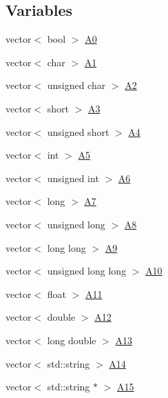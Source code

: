 \subsection*{Variables}
\begin{DoxyCompactItemize}
\item 
vector$<$ bool $>$ \hyperlink{namespaceboost_1_1numeric_1_1ublas_a5464d550b5fd0951f14b0bd93ccb0df2}{A0}
\item 
vector$<$ char $>$ \hyperlink{namespaceboost_1_1numeric_1_1ublas_adecfd0f3cb516b97b0da1565629f59d1}{A1}
\item 
vector$<$ unsigned char $>$ \hyperlink{namespaceboost_1_1numeric_1_1ublas_a04baccb7ef5149e6079f0f39904c10fc}{A2}
\item 
vector$<$ short $>$ \hyperlink{namespaceboost_1_1numeric_1_1ublas_a21ae51ca27e984306163f9e9e23981a3}{A3}
\item 
vector$<$ unsigned short $>$ \hyperlink{namespaceboost_1_1numeric_1_1ublas_a6ee2ec81873323b383e5f3e133cb38d9}{A4}
\item 
vector$<$ int $>$ \hyperlink{namespaceboost_1_1numeric_1_1ublas_aa06ed90bd1a632f409b7bd155a23b610}{A5}
\item 
vector$<$ unsigned int $>$ \hyperlink{namespaceboost_1_1numeric_1_1ublas_a563a365ea9deabb74722dac554da1d70}{A6}
\item 
vector$<$ long $>$ \hyperlink{namespaceboost_1_1numeric_1_1ublas_a665d5a514bd51ed5cb4fea7b064cb0e5}{A7}
\item 
vector$<$ unsigned long $>$ \hyperlink{namespaceboost_1_1numeric_1_1ublas_abf090883e8b56e426046e0da35d7fa34}{A8}
\item 
vector$<$ long long $>$ \hyperlink{namespaceboost_1_1numeric_1_1ublas_a8b6747feac830cb4434b5a06e1e23d9f}{A9}
\item 
vector$<$ unsigned long long $>$ \hyperlink{namespaceboost_1_1numeric_1_1ublas_a916d52ec29025a9ccb0f0436ffb4a5cd}{A10}
\item 
vector$<$ float $>$ \hyperlink{namespaceboost_1_1numeric_1_1ublas_a1c64070e76144ca640278cb67b5a6d37}{A11}
\item 
vector$<$ double $>$ \hyperlink{namespaceboost_1_1numeric_1_1ublas_a588ba2742f8ab5a89778c14813a9c148}{A12}
\item 
vector$<$ long double $>$ \hyperlink{namespaceboost_1_1numeric_1_1ublas_a51d18fd225441f779d79ce1594ea3742}{A13}
\item 
vector$<$ std\+::string $>$ \hyperlink{namespaceboost_1_1numeric_1_1ublas_a1ffbe402403c5cf35bf6e9c7da53f312}{A14}
\item 
vector$<$ std\+::string $\ast$ $>$ \hyperlink{namespaceboost_1_1numeric_1_1ublas_a27f19c7b7ed596e94891f3a5ec9045d8}{A15}
\end{DoxyCompactItemize}


